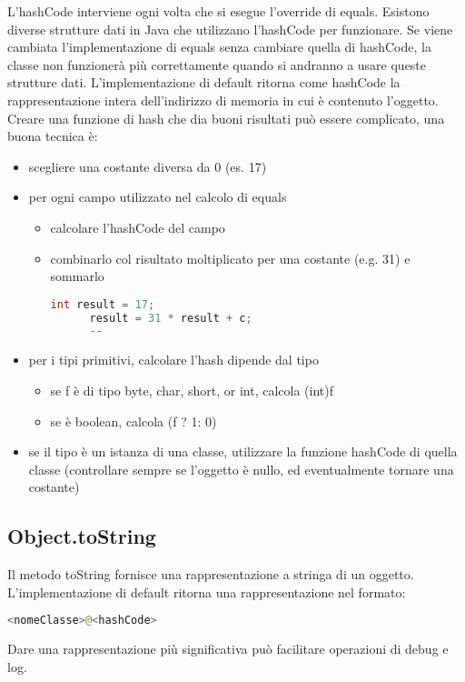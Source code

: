 \documentclass[a4paper,12pt,twoside]{book}
\begin{document}
L'hashCode interviene ogni volta che si esegue l'override di
equals. Esistono diverse strutture dati in Java che utilizzano
l'hashCode per funzionare. Se viene cambiata l'implementazione di
equals senza cambiare quella di hashCode, la classe non funzionerà più
correttamente quando si andranno a usare queste strutture
dati. L'implementazione di default ritorna come hashCode la
rappresentazione intera dell'indirizzo di memoria in cui è contenuto
l'oggetto.
Creare una funzione di hash che dia buoni risultati può essere
complicato, una buona tecnica è:
\begin{itemize}
\item scegliere una costante diversa da 0 (es. 17)
\item per ogni campo utilizzato nel calcolo di equals
  \begin{itemize}
  \item calcolare l'hashCode del campo
  \item combinarlo col risultato moltiplicato per una costante (e.g. 31) e
    sommarlo
    \begin{lstlisting}[caption={},
      label={lst:hashCode},language=Java]
      int result = 17;
      result = 31 * result + c;
      --
    \end{lstlisting}
  \end{itemize}
\item per i tipi primitivi, calcolare l'hash dipende dal tipo
  \begin{itemize}
  \item se f è di tipo byte, char, short, or int, calcola (int)f
  \item se è boolean, calcola (f ? 1: 0)
  \end{itemize}
\item se il tipo è un istanza di una classe, utilizzare la funzione
  hashCode di quella classe (controllare sempre se l'oggetto è nullo,
  ed eventualmente tornare una costante)
\end{itemize} 

\subsection{Object.toString}
Il metodo toString fornisce una rappresentazione a stringa di un
oggetto. L'implementazione di default ritorna una rappresentazione nel
formato:
\begin{lstlisting}[xleftmargin=0.3\textwidth, xrightmargin=0.3\textwidth, language=Java]
  <nomeClasse>@<hashCode>
\end{lstlisting}
Dare una rappresentazione più significativa può facilitare operazioni
di debug e log.
\end{document}
